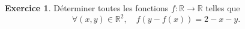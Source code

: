\documentclass[a4paper, 11pt,openany]{article}%
\theoremstyle{plain}
\theoremstyle{definition}
\newtheorem{exo}{Exercice}
\newtheorem{sol}{Solution de l'exercice}
\theoremstyle{remark}
\newcommand{\R}{\mathbb{R}}
\begin{document}
\begin{exo}
Déterminer toutes les fonctions $f\colon \mathbb R \to \mathbb R$ telles que $$\forall (x,y)\in\mathbb R^2, \quad f(y-f(x))=2-x-y.$$
\end{exo}
%
\end{document}
